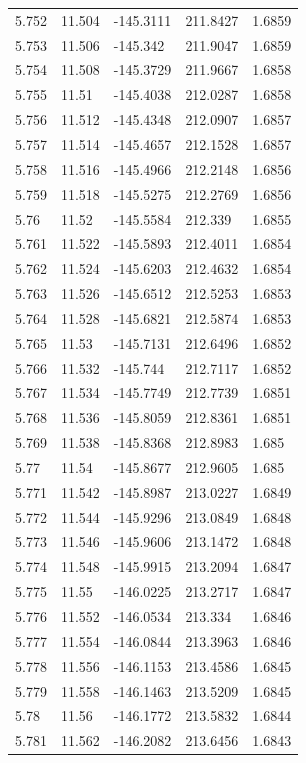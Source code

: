 \begin{tabular}{lllll}
5.752 & 11.504 & -145.3111 & 211.8427 & 1.6859 \\
5.753 & 11.506 & -145.342 & 211.9047 & 1.6859 \\
5.754 & 11.508 & -145.3729 & 211.9667 & 1.6858 \\
5.755 & 11.51 & -145.4038 & 212.0287 & 1.6858 \\
5.756 & 11.512 & -145.4348 & 212.0907 & 1.6857 \\
5.757 & 11.514 & -145.4657 & 212.1528 & 1.6857 \\
5.758 & 11.516 & -145.4966 & 212.2148 & 1.6856 \\
5.759 & 11.518 & -145.5275 & 212.2769 & 1.6856 \\
5.76 & 11.52 & -145.5584 & 212.339 & 1.6855 \\
5.761 & 11.522 & -145.5893 & 212.4011 & 1.6854 \\
5.762 & 11.524 & -145.6203 & 212.4632 & 1.6854 \\
5.763 & 11.526 & -145.6512 & 212.5253 & 1.6853 \\
5.764 & 11.528 & -145.6821 & 212.5874 & 1.6853 \\
5.765 & 11.53 & -145.7131 & 212.6496 & 1.6852 \\
5.766 & 11.532 & -145.744 & 212.7117 & 1.6852 \\
5.767 & 11.534 & -145.7749 & 212.7739 & 1.6851 \\
5.768 & 11.536 & -145.8059 & 212.8361 & 1.6851 \\
5.769 & 11.538 & -145.8368 & 212.8983 & 1.685 \\
5.77 & 11.54 & -145.8677 & 212.9605 & 1.685 \\
5.771 & 11.542 & -145.8987 & 213.0227 & 1.6849 \\
5.772 & 11.544 & -145.9296 & 213.0849 & 1.6848 \\
5.773 & 11.546 & -145.9606 & 213.1472 & 1.6848 \\
5.774 & 11.548 & -145.9915 & 213.2094 & 1.6847 \\
5.775 & 11.55 & -146.0225 & 213.2717 & 1.6847 \\
5.776 & 11.552 & -146.0534 & 213.334 & 1.6846 \\
5.777 & 11.554 & -146.0844 & 213.3963 & 1.6846 \\
5.778 & 11.556 & -146.1153 & 213.4586 & 1.6845 \\
5.779 & 11.558 & -146.1463 & 213.5209 & 1.6845 \\
5.78 & 11.56 & -146.1772 & 213.5832 & 1.6844 \\
5.781 & 11.562 & -146.2082 & 213.6456 & 1.6843 \\

\end{tabular}
